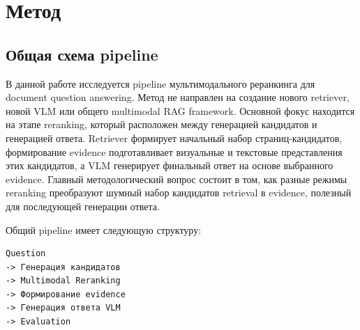 \documentclass[conference]{IEEEtran}
\begin{document}
\begin{table}[t]
\caption{Таблица 2}
\centering
\scriptsize
{}
\end{table}

\section{Метод}

\subsection{Общая схема pipeline}

В данной работе исследуется pipeline мультимодального реранкинга для document question answering. Метод не направлен на создание нового retriever, новой VLM или общего multimodal RAG framework. Основной фокус находится на этапе reranking, который расположен между генерацией кандидатов и генерацией ответа. Retriever формирует начальный набор страниц-кандидатов, формирование evidence подготавливает визуальные и текстовые представления этих кандидатов, а VLM генерирует финальный ответ на основе выбранного evidence. Главный методологический вопрос состоит в том, как разные режимы reranking преобразуют шумный набор кандидатов retrieval в evidence, полезный для последующей генерации ответа.

Общий pipeline имеет следующую структуру:

\begin{verbatim}
Question
-> Генерация кандидатов
-> Multimodal Reranking
-> Формирование evidence
-> Генерация ответа VLM
-> Evaluation
\end{verbatim}
\end{document}
